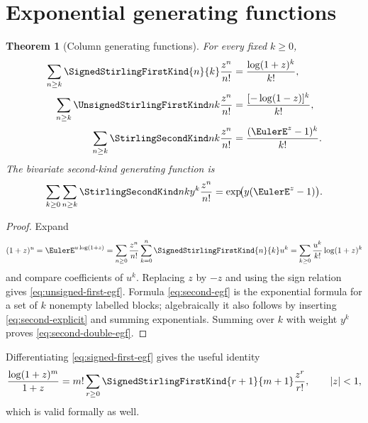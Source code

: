 \documentclass[11pt,a4paper,oneside,openany]{book}
\newtheorem{theorem}{Theorem}[chapter]
\theoremstyle{definition}
\theoremstyle{remark}
\begin{document}
\section{Exponential generating functions}
\begin{theorem}[Column generating functions]\label{thm:stirling-egfs}
For every fixed $k\ge0$,
\begin{align}
 \sum_{n\ge k}\SignedStirlingFirstKind{n}{k}\frac{z^n}{n!}
   &=\frac{\log(1+z)^k}{k!},\label{eq:signed-first-egf}\\
 \sum_{n\ge k}\UnsignedStirlingFirstKind nk\frac{z^n}{n!}
   &=\frac{[-\log(1-z)]^k}{k!},\label{eq:unsigned-first-egf}\\
 \sum_{n\ge k}\StirlingSecondKind nk\frac{z^n}{n!}
   &=\frac{(\EulerE^z-1)^k}{k!}.\label{eq:second-egf}
\end{align}
The bivariate second-kind generating function is
\begin{equation}\label{eq:second-double-egf}
 \sum_{k\ge0}\sum_{n\ge k}\StirlingSecondKind nk y^k\frac{z^n}{n!}
 =\exp\!\bigl(y(\EulerE^z-1)\bigr).
\end{equation}
\end{theorem}
\begin{proof}
Expand
\[
 (1+z)^u=\EulerE^{u\log(1+z)}
 =\sum_{n\ge0}\frac{z^n}{n!}\sum_{k=0}^n\SignedStirlingFirstKind{n}{k}u^k
 =\sum_{k\ge0}\frac{u^k}{k!}\log(1+z)^k
\]
and compare coefficients of $u^k$.  Replacing $z$ by $-z$ and using the sign
relation gives \cref{eq:unsigned-first-egf}.  Formula \cref{eq:second-egf} is the
exponential formula for a set of $k$ nonempty labelled blocks; algebraically it also
follows by inserting \cref{eq:second-explicit} and summing exponentials.  Summing over
$k$ with weight $y^k$ proves \cref{eq:second-double-egf}.
\end{proof}

Differentiating \cref{eq:signed-first-egf} gives the useful identity
\begin{equation}\label{eq:log-over-one-plus}
 \frac{\log(1+z)^m}{1+z}
 =m!\sum_{r\ge0}\SignedStirlingFirstKind{r+1}{m+1}\frac{z^r}{r!},\qquad |z|<1,
\end{equation}
which is valid formally as well.
\end{document}
